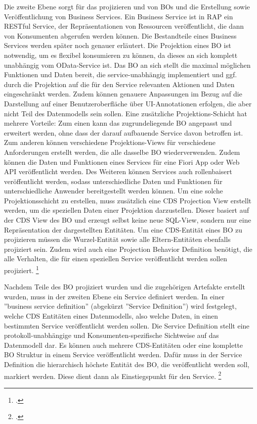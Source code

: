 Die zweite Ebene sorgt für das projizieren und von BOs und die Erstellung sowie Veröffentlichung von Business Services. Ein Business Service ist in RAP ein RESTful Service, der Repräsentationen von Ressourcen veröffentlicht, die dann von Konsumenten abgerufen werden können. Die Bestandteile eines Business Services werden später noch genauer erläutert. Die Projektion eines BO ist notwendig, um es flexibel konsumieren zu können, da dieses an sich komplett unabhängig vom OData-Service ist. Das BO an sich stellt die maximal möglichen Funktionen und Daten bereit, die service-unabhängig implementiert und ggf. durch die Projektion auf die für den Service relevanten Aktionen und Daten eingeschränkt werden. Zudem können genauere Anpassungen \zB im Bezug auf die Darstellung auf einer Benutzeroberfläche über UI-Annotationen erfolgen, die aber nicht Teil des Datenmodells sein sollen. Eine zusätzliche Projektions-Schicht hat mehrere Vorteile: Zum einen kann das zugrundeliegende BO angepasst und erweitert werden, ohne dass der darauf aufbauende Service davon betroffen ist. Zum anderen können verschiedene Projektions-Views für verschiedene Anforderungen erstellt werden, die alle dasselbe BO wiederverwenden. Zudem können die Daten und Funktionen eines Services für eine Fiori App oder Web API veröffentlicht werden. Des Weiteren können Services auch rollenbaisert veröffentlicht werden, sodass unterschiedliche Daten und Funktionen für unterschiedliche Anwender bereitgestellt werden können. Um eine solche Projektionsschicht zu erstellen, muss zusätzlich eine CDS Projection View erstellt werden, um die speziellen Daten einer Projektion darzustellen. Dieser basiert auf der CDS View des BO und erzeugt selbst keine neue SQL-View, sondern nur eine Repräsentation der dargestellten Entitäten. Um eine CDS-Entität eines BO zu projizieren müssen die Wurzel-Entität sowie alle Eltern-Entitäten ebenfalls projiziert sein. Zudem wird auch eine Projection Behavior Definition benötigt, die alle Verhalten, die für einen speziellen Service veröffentlicht werden sollen projiziert. \footcite[Vgl.][]{sap_rap_2023}

Nachdem Teile des BO projiziert wurden und die zugehörigen Artefakte erstellt wurden, muss in der zweiten Ebene ein Service definiert werden. In einer ''business service definition'' (abgekürzt ''Service Definition'') wird festgelegt, welche CDS Entitäten eines Datenmodells, also welche Daten, in einen bestimmten Service veröffentlicht werden sollen. Die Service Definition stellt eine protokoll-unabhängige und Konsumenten-spezifische Sichtweise auf das Datenmodell dar. Es können auch mehrere CDS-Entitäten oder eine komplette BO Struktur in einem Service veröffentlicht werden. Dafür muss in der Service Definition die hierarchisch höchste Entität des BO, die veröffentlicht werden soll, markiert werden. Diese dient dann als Einstiegspunkt für den Service. \footcite[Vgl.][]{sap_rap_2023}

